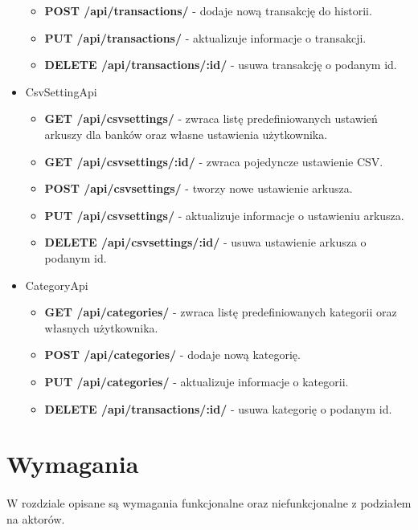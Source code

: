 \documentclass{article}
\begin{document}
\begin{itemize}
\begin{itemize}
				\item \textbf{POST /api/transactions/} - dodaje nową transakcję do historii.
				
				\item \textbf{PUT /api/transactions/} - aktualizuje informacje o transakcji.
				
				\item \textbf{DELETE /api/transactions/:id/} - usuwa transakcję o podanym id.
			\end{itemize}
		\item CsvSettingApi
			\begin{itemize}
				\item \textbf{GET /api/csvsettings/} - zwraca listę predefiniowanych ustawień arkuszy dla banków oraz własne ustawienia użytkownika.
				
				\item \textbf{GET /api/csvsettings/:id/} - zwraca pojedyncze ustawienie CSV.
				
				\item \textbf{POST /api/csvsettings/} - tworzy nowe ustawienie arkusza.
				
				\item \textbf{PUT /api/csvsettings/} - aktualizuje informacje o ustawieniu arkusza.
				
				\item \textbf{DELETE /api/csvsettings/:id/} - usuwa ustawienie arkusza o podanym id.
			\end{itemize}
		\item CategoryApi
			\begin{itemize}
				\item \textbf{GET /api/categories/} - zwraca listę predefiniowanych kategorii oraz własnych użytkownika.
				
				\item \textbf{POST /api/categories/} - dodaje nową kategorię.
				
				\item \textbf{PUT /api/categories/} - aktualizuje informacje o kategorii.
				
				\item \textbf{DELETE /api/transactions/:id/} - usuwa kategorię o podanym id.
			\end{itemize}
	\end{itemize}
	\section{Wymagania}
	\paragraph{} W rozdziale opisane są wymagania funkcjonalne oraz niefunkcjonalne z podziałem na aktorów.
\end{document}
